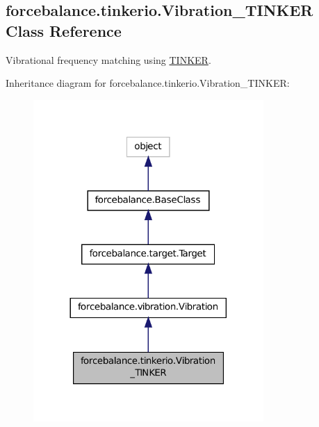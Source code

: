 \hypertarget{classforcebalance_1_1tinkerio_1_1Vibration__TINKER}{\subsection{forcebalance.\-tinkerio.\-Vibration\-\_\-\-T\-I\-N\-K\-E\-R Class Reference}
\label{classforcebalance_1_1tinkerio_1_1Vibration__TINKER}
}


Vibrational frequency matching using \hyperlink{classforcebalance_1_1tinkerio_1_1TINKER}{T\-I\-N\-K\-E\-R}.  




Inheritance diagram for forcebalance.\-tinkerio.\-Vibration\-\_\-\-T\-I\-N\-K\-E\-R\-:
\nopagebreak
\begin{figure}[H]
\begin{center}
\leavevmode
\includegraphics[width=248pt]{classforcebalance_1_1tinkerio_1_1Vibration__TINKER__inherit__graph}
\end{center}
\end{figure}


